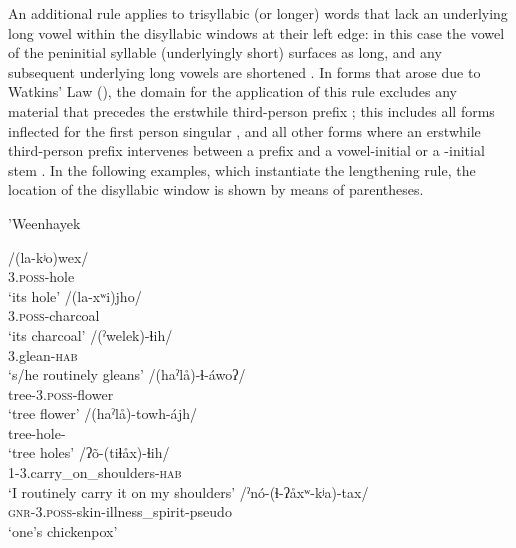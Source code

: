 An additional rule applies to trisyllabic (or longer) words that lack an underlying long vowel within the disyllabic windows at their left edge: in this case the vowel of the peninitial syllable (underlyingly short) surfaces as long, and any subsequent underlying long vowels are shortened \citep[27--29]{KCnd}. In forms that arose due to Watkins' Law (), the domain for the application of this rule excludes any material that precedes the erstwhile third-person prefix \citep[11]{KC94}; this includes all forms inflected for the first person singular , and all other forms where an erstwhile third-person prefix intervenes between a prefix and a vowel-initial or a -initial stem . In the following examples, which instantiate the lengthening rule, the location of the disyllabic window is shown by means of parentheses.

\ea
'Weenhayek \citep[65, 95, 109, 140, 173, 405]{KC16}\\
    \begin{xlist}
        \ex\gll /(la-kʲo)wex/~\\
                3.\textsc{poss}-hole\\
                \glt `its hole'
        \ex\gll /(la-xʷi)jho/~\\
                3.\textsc{poss}-charcoal\\
                \glt `its charcoal'
        \ex\gll /(ˀwelek)-ɬih/~\\
                3.glean-{\textsc{hab}}\\
                \glt `s/he routinely gleans'
        \ex\gll /(haˀlå)-ɬ-áwoʔ/~\\
                tree-3.\textsc{poss}-flower\\
                \glt `tree flower'
        \ex\gll /(haˀlå)-towh-ájh/~\\
                tree-hole-\PL\\
                \glt `tree holes'
        \ex\gll /ʔõ-(tiɬåx)-ɬih/~\label{'otilhààjlhih}\\
                1\SG-3.carry\_on\_shoulders-{\textsc{hab}}\\
                \glt `I routinely carry it on my shoulders'
        \ex\gll /ˀnó-(ɬ-ʔåxʷ-kʲa)-tax/~\label{'not'àjwkyaataj}\\
                {\textsc{gnr}}-3.\textsc{poss}-skin-illness\_spirit-pseudo\\
                \glt `one's chickenpox'
    \end{xlist}
\z

